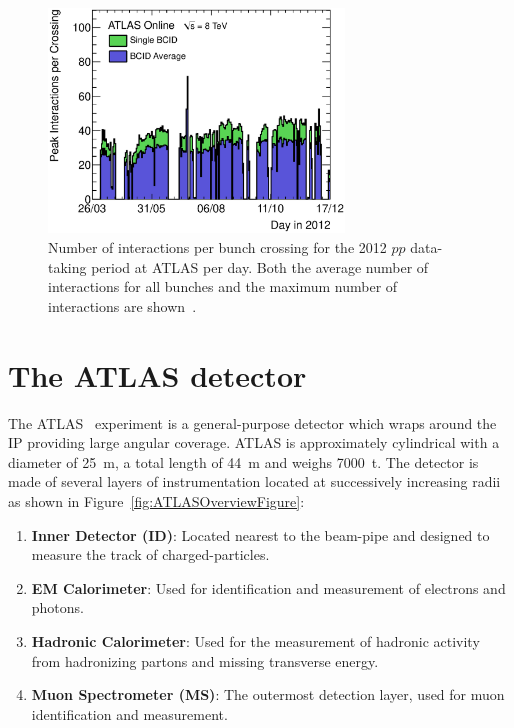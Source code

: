 \begin{figure}[htbp]
  \centering
    \includegraphics[width=0.70\textwidth]{PartDetector/Plots/peakBothMuByDay.eps}
    \caption[Number of interactions per bunch for the 2012 $pp$ data-taking period at ATLAS per day.]{Number of interactions per bunch crossing for the 2012 $pp$ data-taking period at ATLAS per day. Both the average number of interactions for all bunches and the maximum number of interactions are shown~\cite{Detector:LuminosityResults}.}\label{fig:DetectorBunchCrossingInteractions}
\end{figure}

\section{The ATLAS detector}\label{sec:the_atlas_detector}

The ATLAS~\cite{Detector:ATLASExperimentGeneral} experiment is a general-purpose detector which wraps around the IP providing large angular coverage. ATLAS is approximately cylindrical with a diameter of \SI{25}{\meter}, a total length of \SI{44}{\meter} and weighs \SI{7000}{\tonne}. The detector is made of several layers of instrumentation located at successively increasing radii as shown in Figure~\ref{fig:ATLASOverviewFigure}:

\begin{enumerate}
  \item \textbf{Inner Detector (ID)}: Located nearest to the beam-pipe and designed to measure the track of charged-particles.
  \item \textbf{EM Calorimeter}: Used for identification and measurement of electrons and photons.
  \item \textbf{Hadronic Calorimeter}: Used for the measurement of hadronic activity from hadronizing partons and missing transverse energy.
  \item \textbf{Muon Spectrometer (MS)}: The outermost detection layer, used for muon identification and measurement.
\end{enumerate}

